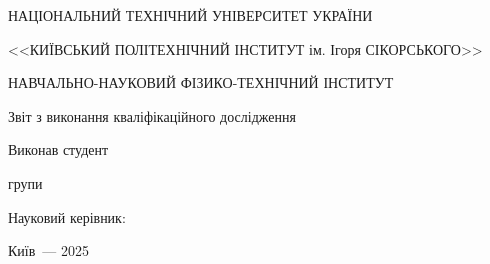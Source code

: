 \thispagestyle{empty}

\begin{center}
НАЦІОНАЛЬНИЙ ТЕХНІЧНИЙ УНІВЕРСИТЕТ УКРАЇНИ \par
<<КИЇВСЬКИЙ ПОЛІТЕХНІЧНИЙ ІНСТИТУТ ім. Ігоря СІКОРСЬКОГО>>\par
НАВЧАЛЬНО-НАУКОВИЙ ФІЗИКО-ТЕХНІЧНИЙ ІНСТИТУТ\par

\vspace{40mm}
{\huge Звіт з виконання кваліфікаційного дослідження \par}

\huge\MakeUppercase{\textbf{\reportTitle}} \par
\end{center}

\vspace{40mm}
\begin{flushright}
Виконав студент

групи \reportAuthorGroup

\reportAuthor

\vspace{20mm}
Науковий керівник:

\supervisorRegalia

\supervisorFio

\end{flushright}

\vspace{20mm}
\begin{center}
{Київ~--- 2025}
\end{center}

\newpage
\thispagestyle{plain}
